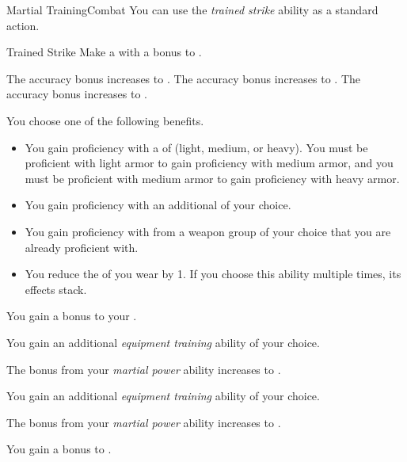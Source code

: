     \begin{feat}{Martial Training}{Combat}
         You can use the \textit{trained strike} ability as a standard action.
        \begin{freeability}{Trained Strike}
            Make a  with a  bonus to .

            \rankline
             The accuracy bonus increases to .
             The accuracy bonus increases to .
             The accuracy bonus increases to .
        \end{freeability}

         You choose one of the following benefits.
        \begin{itemize}
            \item You gain proficiency with a  of  (light, medium, or heavy).
                You must be proficient with light armor to gain proficiency with medium armor, and you must be proficient with medium armor to gain proficiency with heavy armor.
            \item You gain proficiency with an additional  of your choice.
            \item You gain proficiency with  from a weapon group of your choice that you are already proficient with.
            \item You reduce the  of  you wear by 1.
                If you choose this ability multiple times, its effects stack.
        \end{itemize}

         You gain a  bonus to your .

         You gain an additional \textit{equipment training} ability of your choice.

         The bonus from your \textit{martial power} ability increases to .

         You gain an additional \textit{equipment training} ability of your choice.

         The bonus from your \textit{martial power} ability increases to .

         You gain a  bonus to .
    \end{feat}


